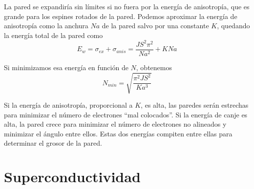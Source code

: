 \documentclass{tufte-book}
\begin{document}
La pared se expandiría sin límites si no fuera por la energía de
anisotropía, que es grande para los espines rotados de la pared.
Podemos aproximar la energía de anisotropía como la anchura $Na$ de la
pared salvo por una constante $K$, quedando la energía total de la
pared como
\begin{equation}
  E_\mathit{w} = σ_\mathit{ex} + σ_\mathit{anis} =
  \frac{JS^2π^2}{Na^2} +KNa
\end{equation}

Si minimizamos esa energía en función de $N$, obtenemos
\begin{equation}
  N_\textit{min} = \sqrt{\frac{π^2JS^2}{Ka^3}}
\end{equation}

Si la energía de anisotropía, proporcional a $K$, es alta, las paredes
serán estrechas para minimizar el número de electrones ``mal
colocados''. Si la energía de canje es alta, la pared crece para
minimizar el número de electrones no alineados y minimizar el ángulo
entre ellos. Estas dos energías compiten entre ellas para determinar
el grosor de la pared.

\chapter{Superconductividad}
\end{document}
